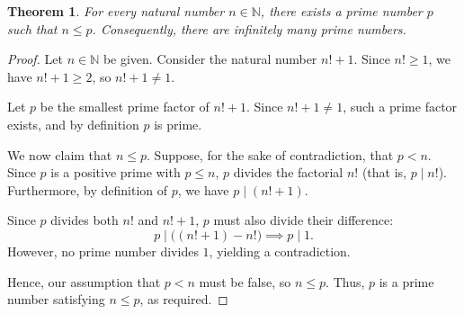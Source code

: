 \documentclass{article}
\newtheorem{theorem}{Theorem}
\begin{document}
\begin{theorem}
For every natural number $n \in \mathbb{N}$, there exists a prime number
$p$ such that $n \le p$. Consequently, there are infinitely many prime
numbers.
\end{theorem}

\begin{proof}
Let $n \in \mathbb{N}$ be given. Consider the natural number $n! + 1$.
Since $n! \ge 1$, we have $n! + 1 \ge 2$, so $n! + 1 \neq 1$.

Let $p$ be the smallest prime factor of $n! + 1$. Since $n! + 1 \neq 1$,
such a prime factor exists, and by definition $p$ is prime.

We now claim that $n \le p$. Suppose, for the sake of contradiction, that
$p < n$.
Since $p$ is a positive prime with $p \le n$, $p$ divides the factorial $n!$
(that is, $p \mid n!$). Furthermore, by definition of $p$, we have
$p \mid (n! + 1)$.

Since $p$ divides both $n!$ and $n! + 1$, $p$ must also divide their
difference:
\[
p \mid \bigl((n! + 1) - n!\bigr) \implies p \mid 1.
\]
However, no prime number divides $1$, yielding a contradiction.

Hence, our assumption that $p < n$ must be false, so $n \le p$. Thus, $p$
is a prime number satisfying $n \le p$, as required.
\end{proof}
\end{document}
